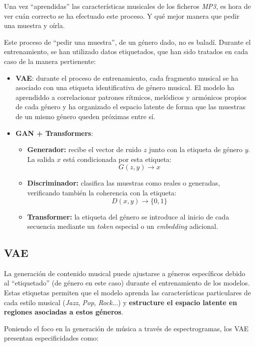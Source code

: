 Una vez ``aprendidas'' las características musicales de los ficheros \emph{MP3}, es hora de ver cuán correcto se ha efectuado este proceso. Y qué mejor manera que pedir una muestra y oírla.

Este proceso de ``pedir una muestra'', de un género dado, no es baladí. Durante el entrenamiento, se han utilizado datos etiquetados, que han sido tratados en cada caso de la manera pertienente:
\begin{itemize}
    \item \textbf{VAE}: durante el proceso de entrenamiento, cada fragmento musical se ha asociado con una etiqueta identificativa de género musical. El modelo ha aprendiddo a correlacionar patrones rítmicos, melódicos y armónicos propios de cada género y ha organizado el espacio latente de forma que las muestras de un mismo género queden próximas entre sí.
    \item \textbf{GAN + Transformers}:
    \begin{itemize}
        \item \textbf{Generador:} recibe el vector de ruido \( z \) junto con la etiqueta de género \( y \). La salida \( x \) está condicionada por esta etiqueta:
        \[
        G(z, y) \rightarrow x
        \]
        \item \textbf{Discriminador:} clasifica las muestras como reales o generadas, verificando también la coherencia con la etiqueta:
        \[
        D(x, y) \rightarrow \{0, 1\}
        \]
        \item \textbf{Transformer:} la etiqueta del género se introduce al inicio de cada secuencia mediante un \emph{token} especial o un \emph{embedding} adicional.
    \end{itemize}
\end{itemize}

\subsection{VAE}

La generación de contenido musical puede ajustarse a géneros específicos debido al ``etiquetado'' (de género en este caso) durante el entrenamiento de los modelos. Estas etiquetas permiten que el modelo aprenda las características particulares de cada estilo musical (\textit{Jazz}, \textit{Pop}, \textit{Rock}...) y \textbf{estructure el espacio latente en regiones asociadas a estos géneros}.

Poniendo el foco en la generación de música a través de espectrogramas, los VAE presentan especificidades como:

